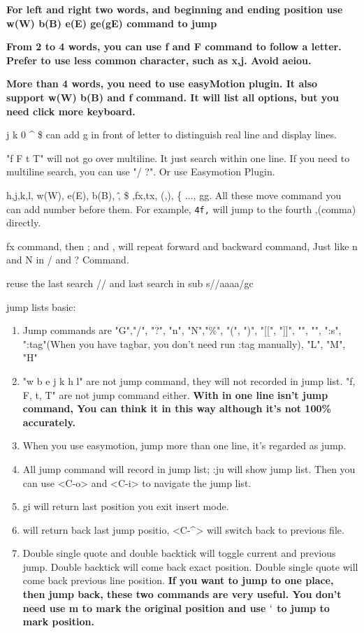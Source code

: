 \documentclass[paper=8.5in:11in, twoside, 12pt, pagesize=pdftex]{book}
\begin{document}
		\textbf{For left and right two words, and beginning and ending position use w(W) b(B) e(E) ge(gE) command to jump}
		
	\textbf{From 2 to 4 words, you can use f and F command to follow a letter. Prefer to use less common character, such as x,j. Avoid aeiou.}
		
	\textbf{More than 4 words, you need to use easyMotion plugin. It also support w(W) b(B) and f command. It will list all options, but you need click more keyboard.}
		
	j k 0 \^{} \$ can add g in front of letter to distinguish real line and display lines.
		
	"f F t T" will not go over multiline. It just search within one line. If you need to multiline search, you can use "/ ?". Or use Easymotion Plugin.
		
	h,j,k,l, w(W), e(E), b(B), \^ , \$ ,fx,tx, (,), \{ ..., gg. All these move command you can add number before them. For example, \verb=4f,= will jump to the fourth ,(comma) directly.    
		
	fx command, then ; and , will repeat forward and backward command, Just like n and N in / and ? Command.
		
	reuse the last search // and last search in sub s//aaaa/gc				
		
	jump lists basic:
		\begin{enumerate}
			\item Jump commands are "G","/", "?", "n", "N","\%", "(", ")", "[[", "]]", "{", "}", ":s", ":tag"(When you have tagbar, you don't need run :tag manually), "L", "M", "H"
			
			\item "w b e j k h l" are not jump command, they will not recorded in jump list. "f, F, t, T" are not jump command either.  \textbf{With in one line isn't jump command, You can think it in this way although it's not 100\% accurately.}
			
			\item When you use easymotion, jump more than one line, it's regarded as jump.
			
			\item All jump command will record in jump list; :ju will show jump list. Then you can use <C-o> and <C-i> to navigate the jump list. 
			
			\item gi will return last position you exit insert mode.
			
			\item <C-o> will return back last jump positio, <C-\^{}> will switch back to previous file. 
			
			\item Double single quote and double backtick will toggle current and previous jump. Double backtick will come back exact position. Double single quote will come back previous line position.  \textbf{If you want to jump to one place, then jump back, these two commands are very useful. You don't need use m to mark the original position and use $`$ to jump to mark position.}
			
		\end{enumerate}
\end{document}
